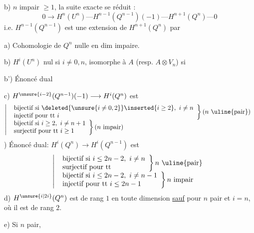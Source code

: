 b) $n$ impair $\geq1$, la suite exacte se réduit :
\[
0\longrightarrow H^n(U^n)\text{---}H^{n-1}(Q^{n-1})(-1)\text{---}H^{n+1}(Q^n)\text{---}0
\]
i.e. $H^{n-1}(Q^{n-1})$ est une extension de $H^{n+1}(Q^n)$ par

a) Cohomologie de $Q^n$ nulle en dim impaire.

b) $H^i(U^n)$ nul si $i\neq0,n$, isomorphe à $A$ (resp. $A\otimes V_n$) si

b') Énoncé dual

c) $H^{\unsure{i-2}}(Q^{n-1})(-1)\longrightarrow H^i(Q^n)$ est
\[
\left|\begin{array}{l}
\left.\begin{array}{l}
\text{bijectif si }\deleted{\unsure{i\neq0,2}}\inserted{i\geq2},\ i\neq n\\
\text{injectif pour tt }i
\end{array}\right\}(n\text{ \uline{pair}})\\[2pt]
\left.\begin{array}{l}
\text{bijectif si }i\geq2,\ i\neq n+1\\
\text{surjectif pour tt }i\geq1
\end{array}\right\}(n\text{ impair})
\end{array}\right.
\]
) Énoncé dual: $H^i(Q^n)\longrightarrow H^i(Q^{n-1})$ est
\[
\left|\begin{array}{l}
\left.\begin{array}{l}
\text{bijectif si }i\leq2n-2,\ i\neq n\\
\text{surjectif pour tt}
\end{array}\right\}n\text{ \uline{pair}}\\
\left.\begin{array}{l}
\text{bijectif si }i\leq2n-2,\ i\neq n-1\\
\text{injectif pour tt }i\leq2n-1
\end{array}\right\}n\text{ impair}
\end{array}\right.
\]
d) $H^{\unsure{i|2i}}(Q^n)$  est de rang $1$ en toute dimension  \uline{sauf} pour $n$ pair et  $i=n$, où il est de rang $2$.

e) Si $n$ pair,

